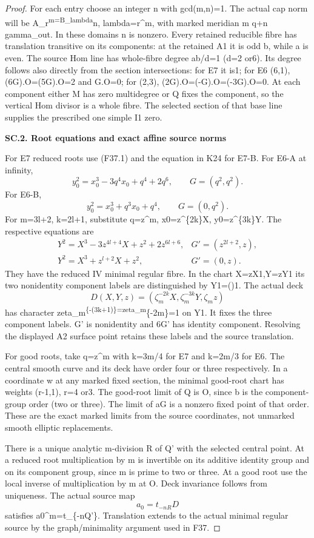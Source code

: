 \begin{proof}
For each entry choose an integer n with gcd(m,n)=1. The actual cap
norm will be A\_r\textsuperscript{m=B\_lambda}n, lambda=r\^{}m, with marked meridian
m q+n gamma\_out. In these domains n is nonzero. Every retained
reducible fibre has translation transitive on its components:
at the retained A1 it is odd b, while a is even. The source Hom
line has whole-fibre degree ab/d=1 (d=2 or6). Its degree follows
also directly from the section intersections: for E7 it is1;
for E6 (6,1), (6G).O=(5G).O=2 and G.O=0; for (2,3),
(2G).O=(-G).O=(-3G).O=0. At each component either M has zero
multidegree or Q fixes the component, so the vertical Hom divisor
is a whole fibre. The selected section of that base line supplies
the prescribed one simple I1 zero.

\par

\medskip\noindent\textbf{SC.2. Root equations and exact affine source norms}

For E7 reduced roots use (F37.1) and the equation in K24 for E7-B.
For E6-A at infinity,
\[
 y_0^2=x_0^3-3q^4x_0+q^4+2q^6,\qquad G=(q^2,q^2).
\]
For E6-B,
\[
 y_0^2=x_0^3+q^3x_0+q^4,\qquad G=(0,q^2).
\]
For m=3l+2, k=2l+1, substitute q=z\^{}m,
x0=z\^{}\{2k\}X, y0=z\^{}\{3k\}Y. The respective equations are
\[
\begin{array}{ll}
Y^2=X^3-3z^{4l+4}X+z^2+2z^{6l+6},&
G'=(z^{2l+2},z),\\
Y^2=X^3+z^{l+2}X+z^2,&G'=(0,z).
\end{array}
\]
They have the reduced IV minimal regular fibre. In the chart
X=zX1,Y=zY1 its two nonidentity component labels are distinguished
by Y1=(\pm)1. The actual deck
\[
 D(X,Y,z)=(\zeta_m^{-2k}X,\zeta_m^{-3k}Y,\zeta_mz)
\]
has character zeta\_m\textsuperscript{\{-(3k+1)\}=zeta\_m}\{-2m\}=1 on Y1.
It fixes the three component labels. G' is nonidentity and 6G'
has identity component. Resolving the displayed A2 surface point
retains these labels and the source translation.

For good roots, take q=z\^{}m with k=3m/4 for E7 and k=2m/3 for E6.
The central smooth curve and its deck have order four or three
respectively. In a coordinate w at any marked fixed section,
the minimal good-root chart has weights (r-1,1), r=4 or3.
The good-root limit of Q is O, since b is the component-group
order (two or three). The limit of aG is a nonzero fixed point
of that order. These are the exact marked limits from the source
coordinates, not unmarked smooth elliptic replacements.

There is a unique analytic m-division R of Q' with the selected
central point. At a reduced root multiplication by m is invertible
on its additive identity group and on its component group, since
m is prime to two or three. At a good root use the local inverse
of multiplication by m at O. Deck invariance follows from
uniqueness. The actual source map
\[
                         a_0=t_{-nR}D
\]
satisfies a0\^{}m=t\_\{-nQ'\}. Translation extends to the actual minimal
regular source by the graph/minimality argument used in F37.


\end{proof}
